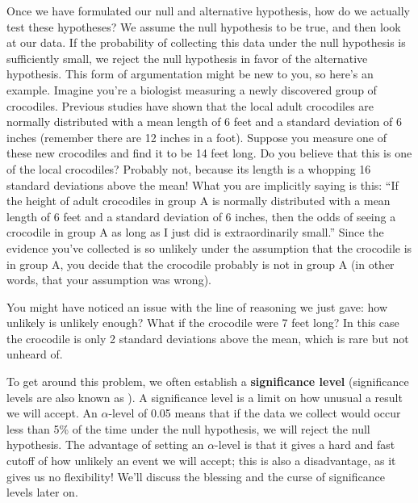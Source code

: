 Once we have formulated our null and alternative hypothesis, how do we actually test these hypotheses? We assume the null hypothesis to be true, and then look at our data.  If the probability of collecting this data under the null hypothesis is sufficiently small, we reject the null hypothesis in favor of the alternative hypothesis. This form of argumentation might be new to you, so here's an example. Imagine you're a biologist measuring a newly discovered group of crocodiles. Previous studies have shown that the local adult crocodiles are normally distributed with a mean length of 6 feet and a standard deviation of 6 inches (remember there are 12 inches in a foot). Suppose you measure one of these new crocodiles and find it to be 14 feet long. Do you believe that this is one of the local crocodiles? Probably not, because its length is a whopping 16 standard deviations above the mean! What you are implicitly saying is this: ``If the height of adult crocodiles in group A is normally distributed with a mean length of 6 feet and a standard deviation of 6 inches, then the odds of seeing a crocodile in group A as long as I just did is extraordinarily small.''  Since the evidence you've collected is so unlikely under the assumption that the crocodile is in group A, you decide that the crocodile probably is not in group A (in other words, that your assumption was wrong).



You might have noticed an issue with the line of reasoning we just gave: how unlikely is unlikely enough?  What if the crocodile were 7 feet long? In this case the crocodile is only 2 standard deviations above the mean, which is rare but not unheard of.



To get around this problem, we often establish a \textbf{significance level} (significance levels are also known as ).  A significance level is a limit on how unusual a result we will accept. An $\alpha$-level of 0.05 means that if the data we collect would occur less than 5\% of the time under the null hypothesis, we will reject the null hypothesis.  The advantage of setting an $\alpha$-level is that it gives a hard and fast cutoff of how unlikely an event we will accept; this is also a disadvantage, as it gives us no flexibility! We'll discuss the blessing and the curse of significance levels later on.



